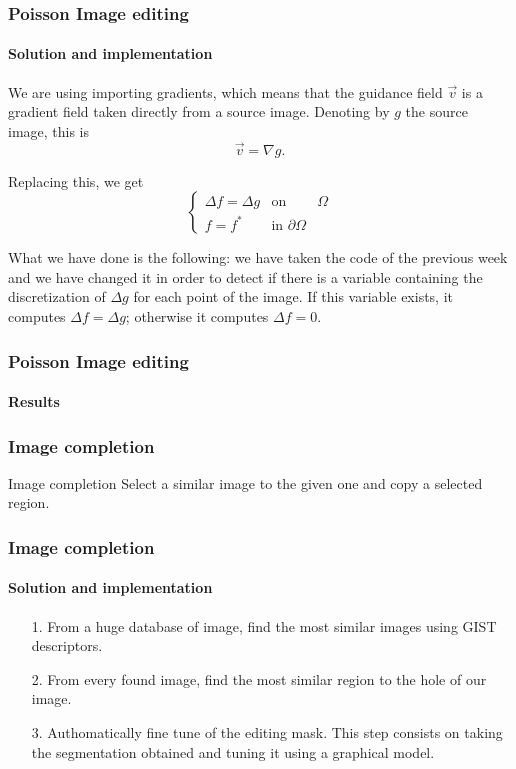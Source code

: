 \documentclass[11pt]{beamer}
\begin{document}
\begin{frame}
\frametitle{Poisson Image editing}
\framesubtitle{Solution and implementation}
We are using importing gradients, which means that the guidance field $\overrightarrow{v}$ is a gradient field taken directly from a source image. Denoting
by $g$ the source image, this is
$$\overrightarrow{v} = \nabla g.$$

Replacing this, we get
\begin{equation*}
\left\{\begin{matrix}
 \Delta f=\Delta g & \text{on } & \Omega\\ 
 f=f^{*}& \text{in }\partial\Omega
\end{matrix}\right.
\end{equation*}

What we have done is the following: we have taken the code of the previous week and we have changed it in order to detect if there is a variable containing the discretization of $\Delta g$ for each point of the image. If this variable exists, it computes $\Delta f = \Delta g$; otherwise it computes $\Delta f = 0$.
\end{frame}

\begin{frame}
\frametitle{Poisson Image editing}
\framesubtitle{Results}

\end{frame}




\begin{frame}
\frametitle{Image completion}

\begin{block}{Image completion}
Select a similar image to the given one and copy a selected region.
\end{block}

\end{frame}

\begin{frame}
\frametitle{Image completion}
\framesubtitle{Solution and implementation}
\begin{itemize}
\item [1.]  From a huge database of image, find the most similar images using GIST descriptors.
\item [2.] From every found image, find the most similar region to the hole of our image.
\item [3.] Authomatically fine tune of the editing mask. This step consists on taking the segmentation obtained  and tuning it using a graphical model.
\end{itemize}
\end{frame}
\end{document}
